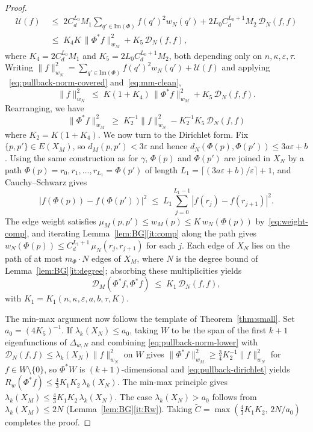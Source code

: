 \documentclass[10pt,reqno]{amsart}
\theoremstyle{remark}
\newcommand{\DD}{\mathcal{D}}
\newcommand{\Rw}{R_{w}}
\begin{document}
\begin{proof}
\begin{equation}
\label{eq:mm-clean}
  \begin{split}
  \mathcal{U}(f)
  &\;\leq\;
  2C_d^{L_0}M_1\!\sum_{q'\in\mathrm{Im}(\Phi)}\!f(q')^2 w_N(q')
  + 2L_0 C_d^{L_0+1}M_2\,\DD_N(f,f)\\
  &\;\leq\; K_4 K\,\|\Phi^*f\|_{w_M}^2 + K_5\,\DD_N(f,f),
  \end{split}
\end{equation}
where $K_4=2C_d^{L_0}M_1$ and $K_5=2L_0 C_d^{L_0+1}M_2$, both
depending only on $n,\kappa,\varepsilon,\tau$. Writing $\|f\|_{w_N}^2
=\sum_{q'\in\mathrm{Im}(\Phi)}f(q')^2 w_N(q')+\mathcal{U}(f)$ and applying
~\eqref{eq:pullback-norm-covered} and~\eqref{eq:mm-clean},
\[
  \|f\|_{w_N}^2
  \;\leq\;
  K(1+K_4)\,\|\Phi^*f\|_{w_M}^2 + K_5\,\DD_N(f,f).
\]
Rearranging, we have
\begin{equation}
\label{eq:pullback-norm-lower}
  \|\Phi^*f\|_{w_M}^2
  \;\geq\;
  K_2^{-1}\|f\|_{w_N}^2 - K_2^{-1}K_5\,\DD_N(f,f)
\end{equation}
where $K_2=K(1+K_4)$.
We now turn to the Dirichlet form. Fix $\{p,p'\}\in E(X_M)$, so
$d_M(p,p')<3\varepsilon$ and hence
$d_N(\Phi(p),\Phi(p'))\leq 3a\varepsilon+b$. Using the same construction as for $\gamma$, $\Phi(p)$ and $\Phi(p')$ are
joined in $X_N$ by a path
$\Phi(p)=r_0,r_1,\ldots,r_{L_1}=\Phi(p')$ of length
$L_1=\lceil(3a\varepsilon+b)/\varepsilon\rceil+1$, and Cauchy--Schwarz gives
\[
  |f(\Phi(p))-f(\Phi(p'))|^2
  \;\leq\;
  L_1\sum_{j=0}^{L_1-1}|f(r_j)-f(r_{j+1})|^2.
\]
The edge weight satisfies
$\mu_M(p,p')\leq w_M(p)\leq K\,w_N(\Phi(p))$
by~\eqref{eq:weight-comp}, and iterating Lemma~\ref{lem:BG}\ref{it:comp}
along the path gives
$w_N(\Phi(p))\leq C_d^{L_1+1}\,\mu_N(r_j,r_{j+1})$ for each $j$.
Each edge of $X_N$ lies on the path of at most $m_\Phi\cdot N$
edges of $X_M$, where $N$ is the degree bound of
Lemma~\ref{lem:BG}\ref{it:degree}; absorbing these multiplicities yields
\begin{equation}
\label{eq:pullback-dirichlet}
  \DD_M(\Phi^*f,\Phi^*f)\;\leq\; K_1\,\DD_N(f,f),
\end{equation}
with $K_1=K_1(n,\kappa,\varepsilon,a,b,\tau,K)$.

The min-max argument now follows the template of
Theorem~\ref{thm:small}. Set $a_0 = (4K_5)^{-1}$. If
$\lambda_k(X_N) \le a_0$, taking $W$ to be the span of the first
$k+1$ eigenfunctions of $\Delta_{w,N}$ and combining
\eqref{eq:pullback-norm-lower} with $\DD_N(f,f) \le \lambda_k(X_N)\|f\|_{w_N}^2$
on $W$ gives $\|\Phi^* f\|_{w_M}^2 \ge \tfrac{3}{4} K_2^{-1} \|f\|_{w_N}^2$
for $f \in W \setminus \{0\}$, so $\Phi^*W$ is $(k+1)$-dimensional and
\eqref{eq:pullback-dirichlet} yields
$\Rw(\Phi^* f) \le \tfrac{4}{3} K_1 K_2 \, \lambda_k(X_N)$. The min-max
principle gives $\lambda_k(X_M) \le \tfrac{4}{3} K_1 K_2 \, \lambda_k(X_N)$.
The case $\lambda_k(X_N) > a_0$ follows from $\lambda_k(X_M) \le 2N$
(Lemma~\ref{lem:BG}\ref{it:Rw}). Taking
$\tilde C = \max(\tfrac{4}{3} K_1 K_2, \, 2N/a_0)$ completes the proof.
\end{proof}
\end{document}
